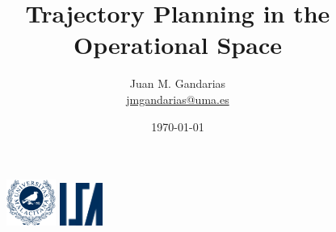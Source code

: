 \documentclass[10pt, aspectratio=169]{beamer}
\title[\href{https://jmgandarias.com}{\textcolor{white}{jmgandarias.com}}]{Trajectory Planning in the Operational Space}
\theoremstyle{remark}
\theoremstyle{definition}
\begin{document}
\justifying

\author[Systems Engineering and Automation]{
	\large
	Juan M. Gandarias\\
    \footnotesize \href{mailto:jmgandarias@uma.es}{jmgandarias@uma.es}
}



\date{\today}

\begin{noheadline}
\begin{frame}
    \maketitle
    \vspace{-1cm}
    \begin{figure}
		\centering
		\includegraphics[height=1.5cm]{./style_files_uma/logo_uma}
        \hspace{10cm}
        \includegraphics[height=1.4cm]{./style_files_uma/logo_isa}
	\end{figure}
 \end{frame}
\end{noheadline}
\end{document}
